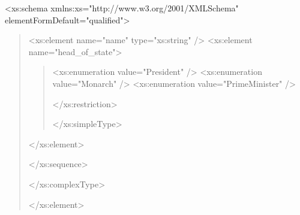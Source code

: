 \documentclass[letterpaper,10pt,lithuanian]{sphinxmanual}
\begin{document}
\sphinxAtStartPar
<xs:schema xmlns:xs="http://www.w3.org/2001/XMLSchema" elementFormDefault="qualified">
\begin{quote}
\begin{description}
\begin{description}
\begin{description}
\sphinxAtStartPar
<xs:element name="name" type="xs:string" />
<xs:element name="head\_of\_state">
\begin{quote}
\begin{description}
\begin{description}
\sphinxAtStartPar
<xs:enumeration value="President" />
<xs:enumeration value="Monarch" />
<xs:enumeration value="PrimeMinister" />

\end{description}

\sphinxAtStartPar
</xs:restriction>

\end{description}

\sphinxAtStartPar
</xs:simpleType>
\end{quote}

\sphinxAtStartPar
</xs:element>

\end{description}

\sphinxAtStartPar
</xs:sequence>

\end{description}

\sphinxAtStartPar
</xs:complexType>

\end{description}

\sphinxAtStartPar
</xs:element>
\end{quote}
\end{document}
